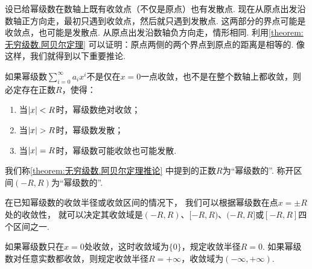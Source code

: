 设已给幂级数在数轴上既有收敛点（不仅是原点）也有发散点.
现在从原点出发沿数轴正方向走，最初只遇到收敛点，然后就只遇到发散点.
这两部分的界点可能是收敛点，也可能是发散点.
从原点出发沿数轴负方向走，情形相同.
利用\cref{theorem:无穷级数.阿贝尔定理} 可以证明：原点两侧的两个界点到原点的距离是相等的.
像这样，我们就得到以下重要推论.
\begin{corollary}\label{theorem:无穷级数.阿贝尔定理推论}
如果幂级数\(\sum\limits_{i=0}^\infty a_i x^i\)不是仅在\(x=0\)一点收敛，也不是在整个数轴上都收敛，则必定存在正数\(R\)，使得：\begin{enumerate}
\item 当\(\abs{x}<R\)时，幂级数绝对收敛；
\item 当\(\abs{x}>R\)时，幂级数发散；
\item 当\(\abs{x}=R\)时，幂级数可能收敛也可能发散.
\end{enumerate}
\end{corollary}

我们称\cref{theorem:无穷级数.阿贝尔定理推论} 中提到的正数\(R\)为“幂级数的”.
称开区间\((-R,R)\)为“幂级数的”.

在已知幂级数的收敛半径或收敛区间的情况下，
我们可以根据幂级数在点\(x = \pm R\)处的收敛性，
就可以决定其收敛域是\((-R,R)\)、\([-R,R)\)、\((-R,R]\)或\([-R,R]\)四个区间之一.

如果幂级数只在\(x=0\)处收敛，这时收敛域为\(\{0\}\)，规定收敛半径\(R=0\).
如果幂级数对任意实数都收敛，则规定收敛半径\(R=+\infty\)，收敛域为\((-\infty,+\infty)\).

